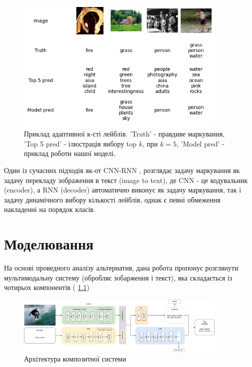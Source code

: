 \documentclass{udstu}
\begin{document}
\begin{figure}[!ht]
	\centering
	\includegraphics[width=0.9\textwidth]{PNG/test-topk}
	\caption{
	Приклад адаптивної к-сті лейблів.
	'Truth' - правдиве маркування,
	'Top 5 pred' - ілюстрація вибору top $k$, при $k=5$,
	'Model pred' - приклад роботи нашої моделі.
	}
	\label{figure:test-topk}
\end{figure}

Один із сучасних підходів як-от CNN-RNN \cite{cnn-rnn},
розглядає задачу маркування як задачу перекладу зображення в текст (image to text),
де CNN - це кодувальник (encoder), а RNN (decoder) автоматично виконує як задачу маркування,
так і задачу динамічного вибору кількості лейблів, однак є певні обмеження
накладенні на порядок класів.


\chapter{Моделювання}

На основі проведного аналізу альтернатив, дана робота пропонує розглянути
мультимодальну систему (обробляє зобарження і текст), яка складається із чотирьох компонентів (\figurename{ \ref{figure:composite}})

\begin{figure}[!ht]
	\centering
	\includegraphics[width=0.9\textwidth]{PNG/composite}
	\caption{Архітектура композитної системи}
	\label{figure:composite}
\end{figure}
\end{document}
